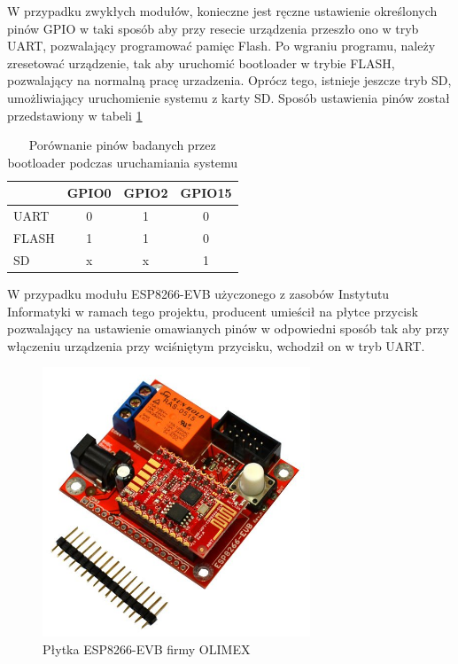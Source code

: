 W przypadku zwykłych modułów, konieczne jest ręczne ustawienie określonych pinów GPIO w taki sposób
aby przy resecie urządzenia przeszło ono w tryb UART, pozwalający programować pamięc Flash.
Po wgraniu programu, należy zresetować urządzenie, tak aby uruchomić bootloader w trybie FLASH, 
pozwalający na normalną pracę urzadzenia. Oprócz tego, istnieje jeszcze tryb SD, umożliwiający 
uruchomienie systemu z karty SD. Sposób ustawienia pinów został przedstawiony w tabeli 
\ref{tabela_trybow}

\begin{table}[H]
    \centering
    \begin{tabular}{lccc}
    \hline
          & \multicolumn{1}{l}{GPIO0} & \multicolumn{1}{l}{GPIO2} & \multicolumn{1}{l}{GPIO15} \\ \hline
    UART  & 0                         & 1                         & 0                          \\
    FLASH & 1                         & 1                         & 0                          \\
    SD    & x                         & x                         & 1                         
    \end{tabular}
    \caption{Porównanie pinów badanych przez bootloader podczas uruchamiania systemu}
    \label{tabela_trybow}
\end{table}
\FloatBarrier
\newpage
W przypadku modułu ESP8266-EVB użyczonego z zasobów Instytutu Informatyki w ramach tego projektu,
producent umieścił na płytce przycisk pozwalający na ustawienie omawianych pinów
w odpowiedni sposób tak aby przy włączeniu urządzenia przy wciśniętym przycisku, wchodził
on w tryb UART.

\begin{figure}[H]
	\centering
    \includegraphics[width=8cm]{./images/ESP8266-EVB.jpg}
    \caption{Płytka ESP8266-EVB firmy OLIMEX}
	\label{esp8266-evb}
\end{figure}
\FloatBarrier


